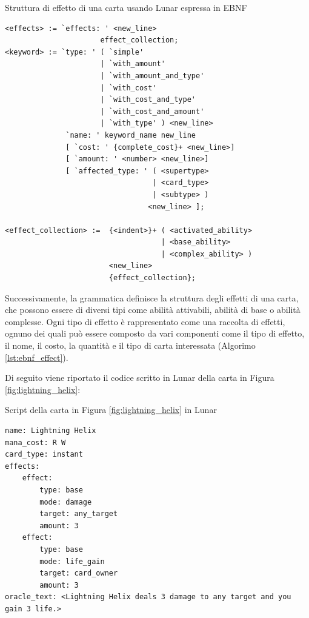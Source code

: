 \begin{algorithm}[ht]
	\caption{Struttura di effetto di una carta usando Lunar espressa in EBNF}
	\label{lst:ebnf_effect}
	\begin{lstlisting}
<effects> := `effects: ' <new_line>
                      effect_collection;
<keyword> := `type: ' ( `simple' 
                      | `with_amount' 
                      | `with_amount_and_type' 
                      | `with_cost' 
                      | `with_cost_and_type' 
                      | `with_cost_and_amount'
                      | `with_type' ) <new_line>
              `name: ' keyword_name new_line
              [ `cost: ' {complete_cost}+ <new_line>]
              [ `amount: ' <number> <new_line>]
              [ `affected_type: ' ( <supertype> 
                                  | <card_type> 
                                  | <subtype> ) 
                                 <new_line> ];
         
<effect_collection> :=  {<indent>}+ ( <activated_ability> 
                                    | <base_ability>
                                    | <complex_ability> ) 
                        <new_line> 
                        {effect_collection};
    \end{lstlisting}
\end{algorithm}

Successivamente, la grammatica definisce la struttura degli effetti di una carta, che possono essere di diversi tipi come abilità attivabili, abilità di base o abilità complesse. Ogni tipo di effetto è rappresentato come una raccolta di effetti, ognuno dei quali può essere composto da vari componenti come il tipo di effetto, il nome, il costo, la quantità e il tipo di carta interessata (Algorimo \ref{lst:ebnf_effect}).

Di seguito viene riportato il codice scritto in Lunar della carta in Figura \ref{fig:lightning_helix}:

\begin{algorithm}[ht]
	\caption{Script della carta in Figura \ref{fig:lightning_helix} in Lunar}
	\label{lst:lightning_helix_ln}
	\begin{lstlisting}
name: Lightning Helix
mana_cost: R W
card_type: instant
effects:
    effect:
        type: base
        mode: damage
        target: any_target
        amount: 3
    effect:
        type: base
        mode: life_gain
        target: card_owner
        amount: 3
oracle_text: <Lightning Helix deals 3 damage to any target and you gain 3 life.>
	\end{lstlisting}
\end{algorithm}




